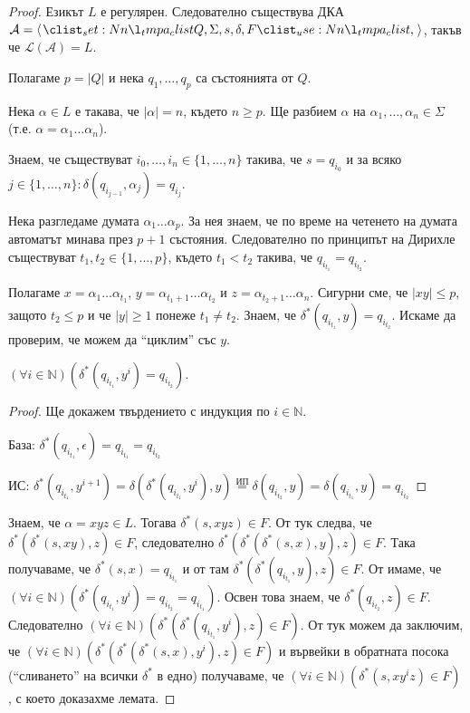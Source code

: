 \begin{proof}
    Езикът $L$ е регулярен.
    Следователно съществува ДКА
    $\mathcal{A} = \opair{Q, \Sigma, s, \delta, F}$,
    такъв че $\mathcal{L}(\mathcal{A}) = L$.

    Полагаме $p = |Q|$ и нека $q_1, \dots, q_p$ са състоянията от $Q$.

    Нека $\alpha \in L$ е такава, че $|\alpha| = n$, където $n \geq p$.
    Ще разбием $\alpha$ на $\alpha_1, \dots, \alpha_n \in \Sigma$ (т.е. $\alpha = \alpha_1\dots\alpha_n$).

    Знаем, че съществуват $i_0, \dots, i_n \in \{1, \dots, n \}$ такива,
    че $s = q_{i_0}$ и за всяко $j \in \{1, \dots, n\} : \delta(q_{i_{j-1}}, \alpha_j) = q_{i_j}$.

    Нека разгледаме думата $\alpha_1 \dots \alpha_p$.
    За нея знаем, че по време на четенето на думата автоматът минава през $p + 1$ състояния.
    Следователно по принципът на Дирихле съществуват
    $t_1, t_2 \in \{1, \dots, p\}$, където $t_1 < t_2$ такива, че $q_{i_{t_1}} = q_{i_{t_2}}$.

    Полагаме $x = \alpha_1 \dots \alpha_{t_1}$, $y = \alpha_{t_1 + 1} \dots \alpha_{t_2}$ и $z = \alpha_{t_2 + 1} \dots \alpha_n$.
    Сигурни сме, че $|xy| \leq p$, защото $t_2 \leq p$ и че $|y| \geq 1$ понеже $t_1 \neq t_2$.
    Знаем, че $\delta^*(q_{i_{t_1}}, y) = q_{i_{t_2}}$.
    Искаме да проверим, че можем да ``циклим'' със $y$.

    \begin{claim}
        $(\forall i \in \mathbb{N}) (\delta^*(q_{i_{t_1}}, y^i) = q_{i_{t_2}})$.
    \end{claim}

    \begin{proof}
        Ще докажем твърдението с индукция по $i \in \mathbb{N}$.

        База: $\delta^*(q_{i_{t_1}}, \epsilon) = q_{i_{t_1}} = q_{i_{t_2}}$ \checkmark

        ИС: $\delta^*(q_{i_{t_1}}, y^{i+1}) = \delta(\delta^*(q_{i_{t_1}}, y^i), y) \overset{\text{ИП}}{=} \delta(q_{i_{t_2}}, y) = \delta(q_{i_{t_1}}, y) = q_{i_{t_2}}$
    \end{proof}

    Знаем, че $\alpha = xyz \in L$.
    Тогава $\delta^*(s, xyz) \in F$.
    От тук следва, че $\delta^*(\delta^*(s, xy), z) \in F$, следователно $\delta^*(\delta^*(\delta^*(s, x), y), z) \in F$.
    Така получаваме, че $\delta^*(s, x) = q_{i_{t_1}}$ и от там $\delta^*(\delta^*(q_{i_{t_1}}, y), z) \in F$.
    От  имаме, че $(\forall i \in \mathbb{N}) (\delta^*(q_{i_{t_1}}, y^i) = q_{i_{t_2}} = q_{i_{t_1}})$.
    Освен това знаем, че $\delta^*(q_{i_{t_2}}, z) \in F$.
    Следователно
    $(\forall i \in \mathbb{N}) (\delta^*(\delta^*(q_{i_{t_1}}, y^i), z) \in F)$.
    От тук можем да заключим, че
    $(\forall i \in \mathbb{N}) (\delta^*(\delta^*(\delta^*(s, x), y^i), z) \in F)$
    и вървейки в обратната посока (``сливането'' на всички $\delta^*$ в едно) получаваме, че
    $(\forall i \in \mathbb{N}) (\delta^*(s, xy^iz) \in F)$,
    с което доказахме лемата.
\end{proof}

